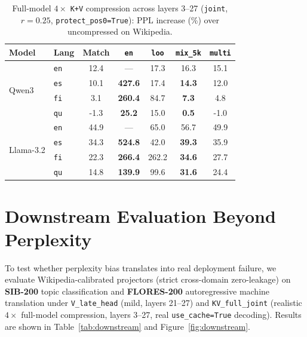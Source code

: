 \documentclass[11pt,a4paper,twocolumn]{article}
\begin{document}
\begin{table}[t]
\centering
\small
\setlength{\tabcolsep}{3.0pt}
\begin{tabular}{llccccc}
\toprule
Model & Lang & Match & \texttt{en} & \texttt{loo} & \textbf{\texttt{mix\_5k}} & \texttt{multi} \\
\midrule
\multirow{4}{*}{Qwen3}
  & \texttt{en} & 12.4 & --- & 17.3 & 16.3 & 15.1 \\
  & \texttt{es} & 10.1 & \textbf{427.6} & 17.4 & \textbf{14.3} & 12.0 \\
  & \texttt{fi} & 3.1 & \textbf{260.4} & 84.7 & \textbf{7.3} & 4.8 \\
  & \texttt{qu} & -1.3 & \textbf{25.2} & 15.0 & \textbf{0.5} & -1.0 \\
\midrule
\multirow{4}{*}{Llama-3.2}
  & \texttt{en} & 44.9 & --- & 65.0 & 56.7 & 49.9 \\
  & \texttt{es} & 34.3 & \textbf{524.8} & 42.0 & \textbf{39.3} & 35.9 \\
  & \texttt{fi} & 22.3 & \textbf{266.4} & 262.2 & \textbf{34.6} & 27.7 \\
  & \texttt{qu} & 14.8 & \textbf{139.9} & 99.6 & \textbf{31.6} & 24.4 \\
\bottomrule
\end{tabular}
\caption{Full-model $4\times$ \texttt{K+V} compression across layers 3--27 (\texttt{joint}, $r=0.25$, \texttt{protect\_pos0=True}): PPL increase (\%) over uncompressed on Wikipedia.}
\label{tab:fullkv}
\end{table}

\section{Downstream Evaluation Beyond Perplexity}
\label{sec:downstream}
To test whether perplexity bias translates into real deployment failure, we evaluate Wikipedia-calibrated projectors (strict cross-domain zero-leakage) on \textbf{SIB-200} topic classification and \textbf{FLORES-200} autoregressive machine translation under \texttt{V\_late\_head} (mild, layers 21--27) and \texttt{KV\_full\_joint} (realistic $4\times$ full-model compression, layers 3--27, real \texttt{use\_cache=True} decoding). Results are shown in Table~\ref{tab:downstream} and Figure~\ref{fig:downstream}.
\end{document}
